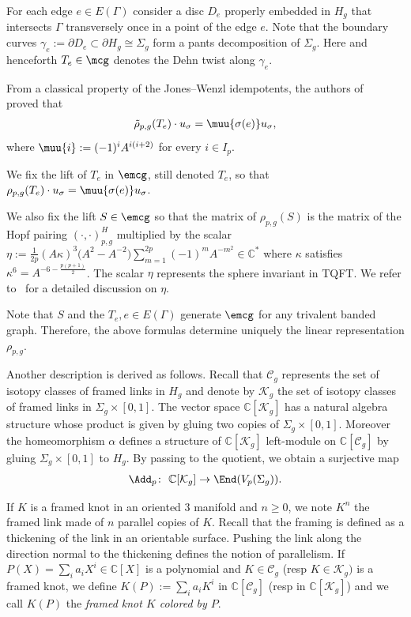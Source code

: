 For each edge $e\in E(\Gamma)$ consider a disc $D_e$ properly embedded in $H_g$ that intersects $\Gamma$ transversely once in a point of the edge $e$. Note that the boundary curves $\gamma_e := \partial D_e \subset \partial H_g \cong \Sigma_g$ form a pants decomposition of $\Sigma_g$. Here and henceforth $T_e\in \mcg$ denotes the Dehn twist along $\gamma_e$.

From a classical property of the Jones--Wenzl idempotents, the authors of~\cite{BHMV2} proved that
\begin{gather*} \tilde{\rho}_{p,g}(T_e) \cdot u_{\sigma} = \muu{\sigma(e)} u_{\sigma}, \end{gather*}
where $\muu{i} := (-1)^i A^{i(i+2)}$ for every $i\in I_p$.

We fix the lift of $T_e$ in $\emcg$, still denoted $T_e$, so that $ \rho_{p,g}(T_e) \cdot u_{\sigma} = \muu{\sigma(e)} u_{\sigma}$.

We also fix the lift $S\in\emcg$ so that the matrix of $\rho_{p,g}(S)$ is the matrix of the Hopf pairing $(\cdot, \cdot )^H_{p,g}$ multiplied by the scalar $\eta:=\frac{1}{2p}(A\kappa)^3\big(A^2-A^{-2}\big)\sum\limits_{m=1}^{2p}{(-1)^mA^{-m^2}}\in \mathbb{C}^*$ where $\kappa$ satisfies $\kappa^6=A^{-6-\frac{p(p+1)}{2}}$. The scalar $\eta$ represents the sphere invariant in TQFT. We refer to~\cite{BHMV2} for a detailed discussion on $\eta$.

 Note that $S$ and the $ T_e, e\in E(\Gamma)$ generate $\emcg$ for any trivalent banded graph. Therefore, the above formulas determine uniquely the linear representation $\rho_{p,g}$.

Another description is derived as follows. Recall that $\mathcal{C}_g$ represents the set of isotopy classes of framed links in $H_g$ and denote by $\mathcal{K}_g$ the set of isotopy classes of framed links in $\Sigma_g\times [0,1]$. The vector space $\mathbb{C}[\mathcal{K}_g]$ has a natural algebra structure whose product is given by gluing two copies of $\Sigma_g\times[0,1]$. Moreover the homeomorphism $\alpha$ defines a structure of $\mathbb{C}[\mathcal{K}_g]$ left-module on $\mathbb{C}[\mathcal{C}_g]$ by gluing $\Sigma_g\times[0,1]$ to $H_g$. By passing to the quotient, we obtain a surjective map
\begin{gather*} \Add_p \colon \ \mathbb{C}[\mathcal{K}_g] \rightarrow \End(V_p(\Sigma_g)).\end{gather*}

If $K$ is a framed knot in an oriented $3$ manifold and $n\geq 0$, we note $K^n$ the framed link made of $n$ parallel copies of $K$. Recall that the framing is defined as a thickening of the link in an orientable surface. Pushing the link along the direction normal to the thickening defines the notion of parallelism. If $P(X)=\sum_i a_i X^i \in \mathbb{C}[X]$ is a polynomial and $K\in \mathcal{C}_g$ (resp $K\in \mathcal{K}_g)$ is a framed knot, we define $K(P):=\sum_i a_i K^i $ in $\mathbb{C}[\mathcal{C}_g]$ (resp in $\mathbb{C}[\mathcal{K}_g]$) and we call $K(P)$ the \textit{framed knot $K$ colored by $P$}.

